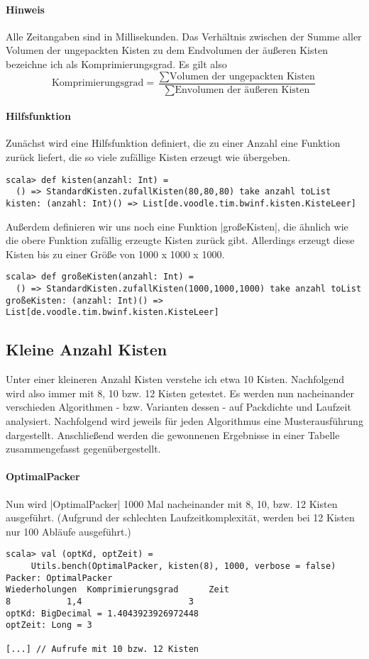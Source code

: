 \paragraph{Hinweis}
 Alle Zeitangaben sind in Millisekunden.
 Das Verhältnis zwischen der Summe aller Volumen der ungepackten Kisten zu dem Endvolumen der äußeren Kisten bezeichne ich als Komprimierungsgrad.
 Es gilt also
 \[ \text{Komprimierungsgrad} = \dfrac{\sum\text{Volumen der ungepackten Kisten}}{\sum\text{Envolumen der äußeren Kisten}} \]
\paragraph{Hilfsfunktion}
 Zunächst wird eine Hilfsfunktion definiert, die zu einer Anzahl eine Funktion zurück liefert, die so viele zufällige Kisten erzeugt wie übergeben.
\begin{lstlisting}
scala> def kisten(anzahl: Int) =
  () => StandardKisten.zufallKisten(80,80,80) take anzahl toList
kisten: (anzahl: Int)() => List[de.voodle.tim.bwinf.kisten.KisteLeer]
\end{lstlisting}
 Außerdem definieren wir uns noch eine Funktion |großeKisten|, die ähnlich wie die obere Funktion zufällig erzeugte Kisten zurück gibt.
 Allerdings erzeugt diese Kisten bis zu einer Größe von 1000 x 1000 x 1000.
\begin{lstlisting}
scala> def großeKisten(anzahl: Int) =
  () => StandardKisten.zufallKisten(1000,1000,1000) take anzahl toList
großeKisten: (anzahl: Int)() => List[de.voodle.tim.bwinf.kisten.KisteLeer]
\end{lstlisting}

\subsection{Kleine Anzahl Kisten}
\label{optAlg}
 Unter einer kleineren Anzahl Kisten verstehe ich etwa 10 Kisten. Nachfolgend wird also immer mit 8, 10 bzw. 12 Kisten getestet.
 Es werden nun nacheinander verschieden Algorithmen - bzw. Varianten dessen - auf Packdichte und Laufzeit analysiert.
 Nachfolgend wird jeweils für jeden Algorithmus eine Musterausführung dargestellt.
 Anschließend werden die gewonnenen Ergebnisse in einer Tabelle zusammengefasst gegenübergestellt.
\paragraph{OptimalPacker}
 Nun wird |OptimalPacker| 1000 Mal nacheinander mit 8, 10, bzw. 12 Kisten ausgeführt.
 (Aufgrund der schlechten Laufzeitkomplexität, werden bei 12 Kisten nur 100 Abläufe ausgeführt.)
\begin{lstlisting}
scala> val (optKd, optZeit) =
	 Utils.bench(OptimalPacker, kisten(8), 1000, verbose = false)
Packer: OptimalPacker
Wiederholungen  Komprimierungsgrad      Zeit
8       	1,4                     3
optKd: BigDecimal = 1.4043923926972448
optZeit: Long = 3

[...] // Aufrufe mit 10 bzw. 12 Kisten
\end{lstlisting}
